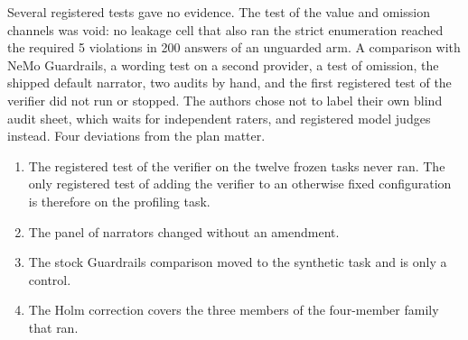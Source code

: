 \documentclass[journal]{IEEEtran}
\begin{document}
Several registered tests gave no evidence. The test of the value and omission
channels was void: no leakage cell that also ran the strict enumeration reached
the required 5 violations in 200 answers of an unguarded arm. A
comparison with NeMo Guardrails, a wording test on a second provider, a test of
omission, the shipped default narrator, two audits by hand, and the first
registered test of the verifier did not run or stopped. The authors chose not to
label their own blind audit sheet, which waits for independent raters, and
registered model judges instead. Four deviations from the plan matter.
\begin{enumerate}
\item The registered test of the verifier on the twelve frozen tasks never ran.
The only registered test of adding the verifier to an otherwise fixed
configuration is therefore on the profiling task.
\item The panel of narrators changed without an amendment.
\item The stock Guardrails comparison moved to the synthetic task and is only a
control.
\item The Holm correction covers the three members of the four-member family
that ran.
\end{enumerate}
\end{document}
